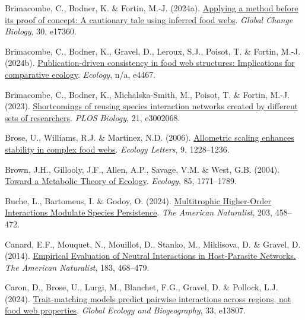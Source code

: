 \documentclass[
]{article}
\newlength{\cslhangindent}
\newenvironment{CSLReferences}[2] %
 {\begin{list}{}{%
  \setlength{\itemindent}{0pt}
  \setlength{\leftmargin}{0pt}
  \setlength{\parsep}{0pt}
  \ifodd #1
   \setlength{\leftmargin}{\cslhangindent}
   \setlength{\itemindent}{-1\cslhangindent}
  \fi
  \setlength{\itemsep}{#2\baselineskip}}}
 {\end{list}}
\begin{document}
\begin{CSLReferences}{1}{0}
Brimacombe, C., Bodner, K. \& Fortin, M.-J. (2024a).
\href{https://doi.org/10.1111/gcb.17360}{Applying a method before its
proof of concept: {A} cautionary tale using inferred food webs}.
\emph{Global Change Biology}, 30, e17360.

Brimacombe, C., Bodner, K., Gravel, D., Leroux, S.J., Poisot, T. \&
Fortin, M.-J. (2024b).
\href{https://doi.org/10.1002/ecy.4467}{Publication-driven consistency
in food web structures: {Implications} for comparative ecology}.
\emph{Ecology}, n/a, e4467.

Brimacombe, C., Bodner, K., Michalska-Smith, M., Poisot, T. \& Fortin,
M.-J. (2023).
\href{https://doi.org/10.1371/journal.pbio.3002068}{Shortcomings of
reusing species interaction networks created by different sets of
researchers}. \emph{PLOS Biology}, 21, e3002068.

Brose, U., Williams, R.J. \& Martinez, N.D. (2006).
\href{https://doi.org/10.1111/j.1461-0248.2006.00978.x}{Allometric
scaling enhances stability in complex food webs}. \emph{Ecology
Letters}, 9, 1228--1236.

Brown, J.H., Gillooly, J.F., Allen, A.P., Savage, V.M. \& West, G.B.
(2004). \href{https://doi.org/10.1890/03-9000}{Toward a {Metabolic
Theory} of {Ecology}}. \emph{Ecology}, 85, 1771--1789.

Buche, L., Bartomeus, I. \& Godoy, O. (2024).
\href{https://doi.org/10.1086/729222}{Multitrophic {Higher-Order
Interactions Modulate Species Persistence}}. \emph{The American
Naturalist}, 203, 458--472.

Canard, E.F., Mouquet, N., Mouillot, D., Stanko, M., Miklisova, D. \&
Gravel, D. (2014). \href{https://doi.org/10.1086/675363}{Empirical
{Evaluation} of {Neutral Interactions} in {Host-Parasite Networks}.}
\emph{The American Naturalist}, 183, 468--479.

Caron, D., Brose, U., Lurgi, M., Blanchet, F.G., Gravel, D. \& Pollock,
L.J. (2024). \href{https://doi.org/10.1111/geb.13807}{Trait-matching
models predict pairwise interactions across regions, not food web
properties}. \emph{Global Ecology and Biogeography}, 33, e13807.


\end{CSLReferences}
\end{document}
